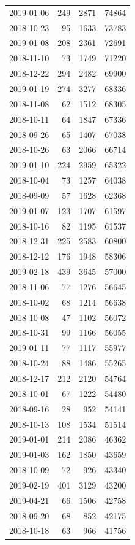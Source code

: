 \begin{tabular}{lrrr}
2019-01-06 & 249 & 2871 & 74864 \\
2018-10-23 & 95 & 1633 & 73783 \\
2019-01-08 & 208 & 2361 & 72691 \\
2018-11-10 & 73 & 1749 & 71220 \\
2018-12-22 & 294 & 2482 & 69900 \\
2019-01-19 & 274 & 3277 & 68336 \\
2018-11-08 & 62 & 1512 & 68305 \\
2018-10-11 & 64 & 1847 & 67336 \\
2018-09-26 & 65 & 1407 & 67038 \\
2018-10-26 & 63 & 2066 & 66714 \\
2019-01-10 & 224 & 2959 & 65322 \\
2018-10-04 & 73 & 1257 & 64038 \\
2018-09-09 & 57 & 1628 & 62368 \\
2019-01-07 & 123 & 1707 & 61597 \\
2018-10-16 & 82 & 1195 & 61537 \\
2018-12-31 & 225 & 2583 & 60800 \\
2018-12-12 & 176 & 1948 & 58306 \\
2019-02-18 & 439 & 3645 & 57000 \\
2018-11-06 & 77 & 1276 & 56645 \\
2018-10-02 & 68 & 1214 & 56638 \\
2018-10-08 & 47 & 1102 & 56072 \\
2018-10-31 & 99 & 1166 & 56055 \\
2019-01-11 & 77 & 1117 & 55977 \\
2018-10-24 & 88 & 1486 & 55265 \\
2018-12-17 & 212 & 2120 & 54764 \\
2018-10-01 & 67 & 1222 & 54480 \\
2018-09-16 & 28 & 952 & 54141 \\
2018-10-13 & 108 & 1534 & 51514 \\
2019-01-01 & 214 & 2086 & 46362 \\
2019-01-03 & 162 & 1850 & 43659 \\
2018-10-09 & 72 & 926 & 43340 \\
2019-02-19 & 401 & 3129 & 43200 \\
2019-04-21 & 66 & 1506 & 42758 \\
2018-09-20 & 68 & 852 & 42175 \\
2018-10-18 & 63 & 966 & 41756 \\

\end{tabular}
